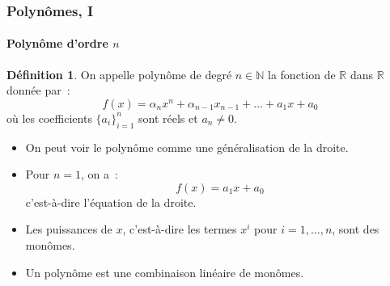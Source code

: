 \documentclass[10pt,notheorems]{beamer}
\theoremstyle{plain}
\theoremstyle{definition} %
\newtheorem{definition}{Définition}
\begin{document}
\begin{frame}
  \frametitle{Polynômes, I}
  \framesubtitle{Polynôme d'ordre $n$}
  \hypertarget{slide_polynome_definition}{}

  \bigskip

  \begin{definition}
    On appelle polynôme de degré $n\in\mathbb N$ la fonction de $\mathbb R$ dans $\mathbb R$ donnée par~:
    \[
      f(x) = \alpha_n x^n + \alpha_{n-1}x_{n-1}+\ldots+a_1x+a_0
    \]
    où les coefficients $\{a_i\}_{i=1}^n$ sont réels et $a_n\neq 0$.
  \end{definition}

  \bigskip

  \begin{itemize}

  \item On peut voir le polynôme comme une généralisation de la droite.\newline

  \item Pour $n=1$, on a~:
    \[
      f(x) = a_1 x + a_0
    \]
    c'est-à-dire l'équation de la droite.\newline

  \item Les puissances de $x$, c'est-à-dire les termes $x^i$ pour $i=1,\ldots,n$, sont des monômes.\newline

  \item Un polynôme est une combinaison linéaire de monômes.

  \end{itemize}

\end{frame}
\end{document}
